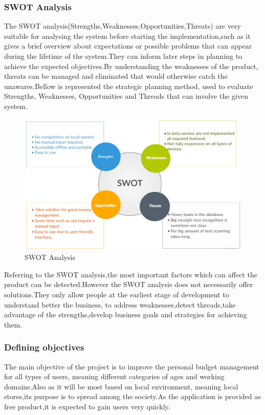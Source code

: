 \subsubsection{SWOT Analysis}
The SWOT analysis(Strengths,Weaknesses,Opportunities,Threats) are very suitable for analysing the system before starting the implementation,such as it gives a brief overview about expectations or possible problems that can appear during the lifetime of the system.They can inform later steps in planning to achieve the expected objectives.By understanding the weaknesses of the product, threats can be managed and eliminated that would otherwise catch the unawares.Bellow is represented the strategic planning method, used to evaluate Strengths, Weaknesses, Opportunities and Threads that can involve the given system.
\begin{figure}[H]
	\centering
	\includegraphics[width=18cm]{Chapter4/img1.png}
	\caption{SWOT Analysis}
	\label{fig:SWOT Analysis}
\end{figure}
\newpage
Referring to the SWOT analysis,the most important factors which can affect the product can be detected.However the SWOT analysis does not necessarily offer solutions.They only allow people at the earliest stage of development to understand better the business, to address weaknesses,detect threads,take advantage of the strengths,develop business goals and strategies for achieving them.
\subsubsection{Defining objectives}
The main objective of the project is to improve the personal budget management for all types of users, meaning different categories of ages and working domains.Also as it will be most based on local environment, meaning local stores,its purpose is to spread among the society.As the application is provided as free product,it is expected to gain users very quickly.
